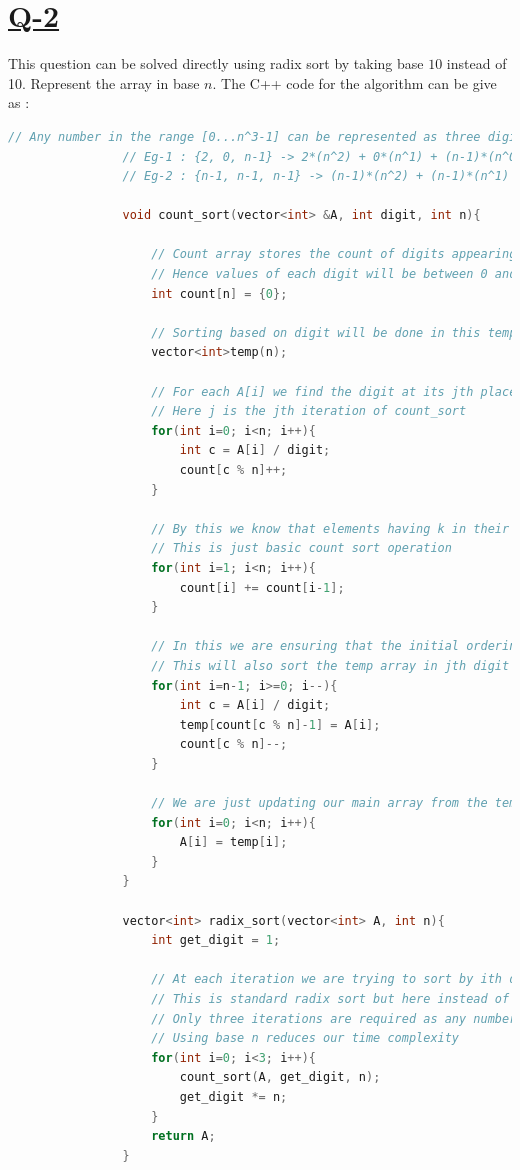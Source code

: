 \documentclass[14pt]{article}
\begin{document}
		\section*{\underline{Q-2}}
			\noindent
			This question can be solved directly using radix sort by taking base $10$ instead of 10. Represent the array in base $n$. The C++ code for the algorithm can be give as : 
			\begin{lstlisting}[language=C++]	
				// Any number in the range [0...n^3-1] can be represented as three digit number in base n
				// Eg-1 : {2, 0, n-1} -> 2*(n^2) + 0*(n^1) + (n-1)*(n^0) = 2n^2 + n - 1
				// Eg-2 : {n-1, n-1, n-1} -> (n-1)*(n^2) + (n-1)*(n^1) + (n-1)*(n^0) = n^3-1 
				
				void count_sort(vector<int> &A, int digit, int n){
					
					// Count array stores the count of digits appearing in the number in base n
					// Hence values of each digit will be between 0 and n-1
					int count[n] = {0};
					
					// Sorting based on digit will be done in this temporary vector
					vector<int>temp(n);
					
					// For each A[i] we find the digit at its jth place of base n representation
					// Here j is the jth iteration of count_sort
					for(int i=0; i<n; i++){
						int c = A[i] / digit;
						count[c % n]++;
					}
					
					// By this we know that elements having k in their jth place of base n representation lies at count[j] place in array
					// This is just basic count sort operation 
					for(int i=1; i<n; i++){
						count[i] += count[i-1];
					}
					
					// In this we are ensuring that the initial ordering is maintained in case two elements have same digit at jth place
					// This will also sort the temp array in jth digit
					for(int i=n-1; i>=0; i--){
						int c = A[i] / digit;
						temp[count[c % n]-1] = A[i];
						count[c % n]--;
					}
					
					// We are just updating our main array from the temp array because it is sorted at jth place
					for(int i=0; i<n; i++){
						A[i] = temp[i];
					}
				}
				
				vector<int> radix_sort(vector<int> A, int n){
					int get_digit = 1;
					
					// At each iteration we are trying to sort by ith digit 
					// This is standard radix sort but here instead of base 10, we are using base n
					// Only three iterations are required as any number between 0..n^3-1 can be represented using only 3 digits in base n
					// Using base n reduces our time complexity
					for(int i=0; i<3; i++){
						count_sort(A, get_digit, n);
						get_digit *= n;
					}
					return A;
				}		
			\end{lstlisting}
\end{document}

